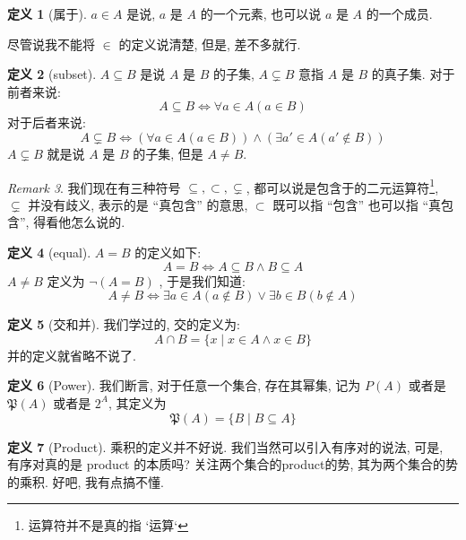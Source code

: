 \documentclass[10pt]{ctexart}
\theoremstyle{definition}
\theoremstyle{definition}
\newtheorem{definition}{定义}[section]
\theoremstyle{plain}
\theoremstyle{remark}
\newtheorem{remark}[definition]{Remark}
\begin{document}
\begin{definition}[属于]
 \(a \in A \) 是说, \(a\) 是 \(A\) 的一个元素, 也可以说 \(a\) 是 \(A\) 的一个成员. 
\end{definition}
尽管说我不能将 \(\in\) 的定义说清楚, 但是, 差不多就行. 
\begin{definition}[subset] 
\(A \subseteq B \) 是说 \(A \) 是 \(B\) 的子集, \(A \subsetneq B\) 意指 \(A\) 是 \(B\) 的真子集. 对于前者来说: 
\begin{equation}
A \subseteq B \iff \forall a \in A (a \in B)
\end{equation}
对于后者来说: 
\begin{equation}
A \subsetneq B \iff (\forall a \in A (a \in B)) \wedge (\exists a' \in A  (a' \notin B))
\end{equation}
\(A \subsetneq B\) 就是说 \(A\) 是 \(B\) 的子集, 但是 \(A \ne B \). 
\end{definition}
\begin{remark}
我们现在有三种符号 \(\subseteq , \subset , \subsetneq\), 都可以说是包含于的二元运算符\footnote{运算符并不是真的指 `运算`}, \(\subsetneq\) 并没有歧义, 表示的是 ``真包含'' 的意思, \(\subset\) 既可以指 ``包含'' 也可以指 ``真包含'', 得看他怎么说的.
\end{remark}
\begin{definition}[equal]
\(A = B \) 的定义如下: 
\begin{equation}
A = B \iff A \subseteq B \wedge B \subseteq A 
\end{equation}
\(A \ne B \) 定义为 \(\neg (A = B ) \) , 于是我们知道: 
\begin{equation}
A \ne B \iff  \exists a \in A (a \notin B) \vee \exists b \in B (b \notin A) 
\end{equation}
\end{definition}
\begin{definition}[交和并]
我们学过的, 交的定义为: 
\begin{equation}
A \cap B = \{ x \mid x \in A \wedge x \in B \} 
\end{equation}
并的定义就省略不说了. 
\end{definition}
\begin{definition}[Power] 
我们断言, 对于任意一个集合, 存在其幂集, 记为 \(P (A) \) 或者是 \(\mathfrak P (A) \) 或者是 \(2 ^{A}\), 其定义为
\begin{equation}
\mathfrak P (A)  = \{ B \mid B \subseteq A \} 
\end{equation}
\end{definition}
\begin{definition}[Product]
乘积的定义并不好说. 我们当然可以引入有序对的说法, 可是, 有序对真的是 product 的本质吗? 关注两个集合的product的势, 其为两个集合的势的乘积. 好吧, 我有点搞不懂. 
\end{definition}
\end{document}
